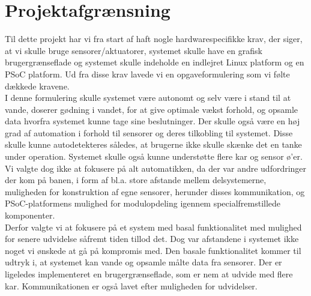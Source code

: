 \chapter{Projektafgrænsning}
Til dette projekt har vi fra start af haft nogle hardwarespecifikke krav, der siger, at vi skulle bruge sensorer/aktuatorer, systemet skulle have en grafisk brugergrænseflade og systemet skulle indeholde en indlejret Linux platform og en PSoC platform. Ud fra disse krav lavede vi en opgaveformulering som vi følte dækkede kravene. \\
I denne formulering skulle systemet være autonomt og selv være i stand til at vande, doserer gødning i vandet, for at give optimale vækst forhold, og opsamle data hvorfra systemet kunne tage sine beslutninger. Der skulle også være en høj grad af automation i forhold til sensorer og deres tilkobling til systemet. Disse skulle kunne autodetekteres således, at brugerne ikke skulle skænke det en tanke under operation. Systemet skulle også kunne understøtte flere kar og sensor ø'er. \\
Vi valgte dog ikke at fokusere på alt automatikken, da der var andre udfordringer der kom på banen, i form af bl.a. store afstande mellem delsystemerne, muligheden for konstruktion af egne sensorer, herunder disses kommunikation, og PSoC-platformens mulighed for modulopdeling igennem specialfremstillede komponenter. \\
Derfor valgte vi at fokusere på et system med basal funktionalitet med mulighed for senere udvidelse såfremt tiden tillod det. Dog var afstandene i systemet ikke noget vi ønskede at gå på kompromis med. Den basale funktionalitet kommer til udtryk i, at systemet kan vande og opsamle målte data fra sensorer. Der er ligeledes implementeret en brugergrænseflade, som er nem at udvide med flere kar. Kommunikationen er også lavet efter muligheden for udvidelser. \\\\\\

